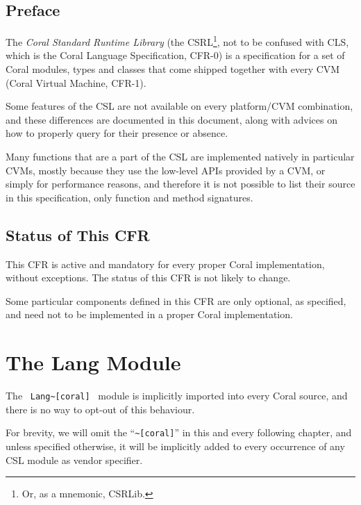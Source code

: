
\section*{Preface}

The {\em Coral Standard Runtime Library} (the CSRL\footnote{Or, as a mnemonic, CSRLib.}, not to be confused with CLS, which is the Coral Language Specification, CFR-0) is a specification for a set of Coral modules, types and classes that come shipped together with every CVM (Coral Virtual Machine, CFR-1). 

Some features of the CSL are not available on every platform/CVM combination, and these differences are documented in this document, along with advices on how to properly query for their presence or absence. 

Many functions that are a part of the CSL are implemented natively in particular CVMs, mostly because they use the low-level APIs provided by a CVM, or simply for performance reasons, and therefore it is not possible to list their source in this specification, only function and method signatures. 





\section*{Status of This CFR}

This CFR is active and mandatory for every proper Coral implementation, without exceptions. The status of this CFR is not likely to change. 

Some particular components defined in this CFR are only optional, as specified, and need not to be implemented in a proper Coral implementation. 




\chapter{The Lang Module}
\label{sec:lang}

The ~\lstinline!Lang~[coral]!~ module is implicitly imported into every Coral source, and there is no way to opt-out of this behaviour. 

For brevity, we will omit the ``\lstinline!~[coral]!'' in this and every following chapter, and unless specified otherwise, it will be implicitly added to every occurrence of any CSL module as vendor specifier. 

